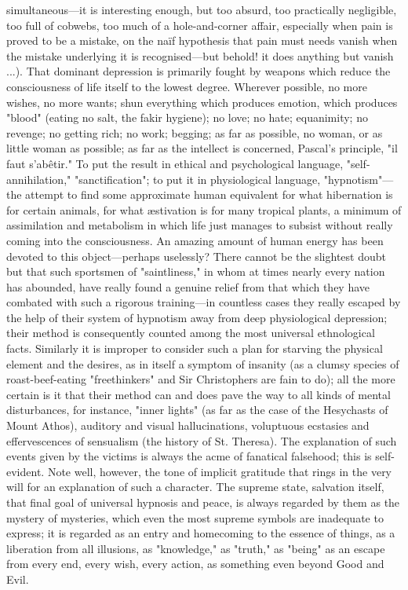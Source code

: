 \documentclass[12pt]{article}
\begin{document}
simultaneous---it is interesting enough, but too absurd, too practically negligible, too full of cobwebs, too much of a hole-and-corner affair, especially when pain is proved to be a mistake, on the naïf hypothesis that pain must needs vanish when the mistake underlying it is recognised---but behold! it does anything but vanish ...). That dominant depression is primarily fought by weapons which reduce the consciousness of life itself to the lowest degree. Wherever possible, no more wishes, no more wants; shun everything which produces emotion, which produces "blood" (eating no salt, the fakir hygiene); no love; no hate; equanimity; no revenge; no getting rich; no work; begging; as far as possible, no woman, or as little woman as possible; as far as the intellect is concerned, Pascal's principle, "il faut s'abêtir." To put the result in ethical and psychological language, "self-annihilation," "sanctification"; to put it in physiological language, "hypnotism"---the attempt to find some approximate human equivalent for what hibernation is for certain animals, for what æstivation is for many tropical plants, a minimum of assimilation and metabolism in which life just manages to subsist without really coming into the consciousness. An amazing amount of human energy has been devoted to this object---perhaps uselessly? There cannot be the slightest doubt but that such sportsmen of "saintliness," in whom at times nearly every nation has abounded, have really found a genuine relief from that which they have combated with such a rigorous training---in countless cases they really escaped by the help of their system of hypnotism away from deep physiological depression; their method is consequently counted among the most universal ethnological facts. Similarly it is improper to consider such a plan for starving the physical element and the desires, as in itself a symptom of insanity (as a clumsy species of roast-beef-eating "freethinkers" and Sir Christophers are fain to do); all the more certain is it that their method can and does pave the way to all kinds of mental disturbances, for instance, "inner lights" (as far as the case of the Hesychasts of Mount Athos), auditory and visual hallucinations, voluptuous ecstasies and effervescences of sensualism (the history of St. Theresa). The explanation of such events given by the victims is always the acme of fanatical falsehood; this is self-evident. Note well, however, the tone of implicit gratitude that rings in the very will for an explanation of such a character. The supreme state, salvation itself, that final goal of universal hypnosis and peace, is always regarded by them as the mystery of mysteries, which even the most supreme symbols are inadequate to express; it is regarded as an entry and homecoming to the essence of things, as a liberation from all illusions, as "knowledge," as "truth," as "being" as an escape from every end, every wish, every action, as something even beyond Good and Evil.
\end{document}

